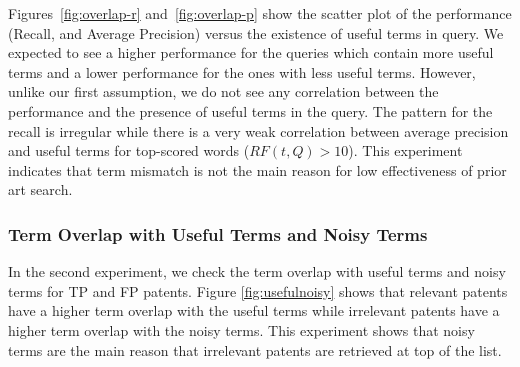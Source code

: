 Figures~\ref{fig:overlap-r} and~\ref{fig:overlap-p} show the scatter plot of the performance (Recall, and Average Precision) versus the existence of useful terms in query. 
We expected to see a higher performance for the queries which contain more useful terms and a lower performance for the ones with less useful terms. However, unlike our first assumption, we do not see any correlation between the performance and the presence of useful terms in the query. The pattern for the recall is irregular while there is a very weak correlation between average precision and useful terms for top-scored words ($RF(t, Q)>10$). This experiment indicates that term mismatch is not the main reason for low effectiveness of prior art search. 
\subsubsection{Term Overlap with Useful Terms and Noisy Terms}
In the second experiment, we check the term overlap with useful terms and noisy terms for TP and FP patents. Figure \ref{fig:usefulnoisy} shows that relevant patents have a higher term overlap with the useful terms while irrelevant patents have a higher term overlap with the noisy terms. This experiment shows that noisy terms are the main reason that irrelevant patents are retrieved at top of the list. 
